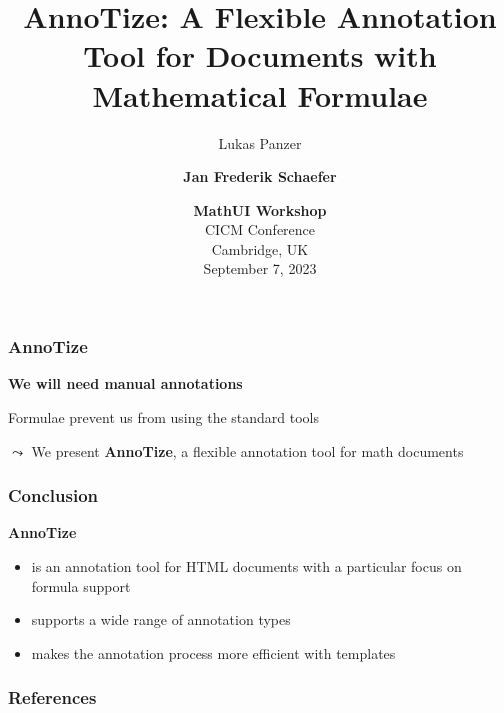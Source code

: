 \documentclass[aspectratio=169]{beamer}
\title{AnnoTize: A Flexible Annotation Tool for Documents with Mathematical Formulae}
\author{Lukas Panzer \and \textbf{Jan Frederik Schaefer}}
\institute{FAU Erlangen-N\"urnberg/KWARC}
\date{\textbf{MathUI Workshop}\\CICM Conference\\Cambridge, UK\\September 7, 2023}
\begin{document}
\frame\titlepage




\begin{frame}
    \frametitle{AnnoTize}
    {
        \centering
        \textbf{We will need manual annotations}
        \\
        \vspace{2em}\par
        Formulae prevent us from using the standard tools
        \\
        \vspace{2em}\par
        $\leadsto$ We present \textbf{AnnoTize}, a flexible annotation tool for math documents\\
    }
\end{frame}


\begin{frame}
    \frametitle{Conclusion}
    \textbf{AnnoTize}
    \begin{itemize}
        \item is an annotation tool for HTML documents with a particular focus on formula support
        \item supports a wide range of annotation types
        \item makes the annotation process more efficient with templates
    \end{itemize}
\end{frame}


\begin{frame}[allowframebreaks,t]
    \frametitle{References}
    \printbibliography
\end{frame}
\end{document}
